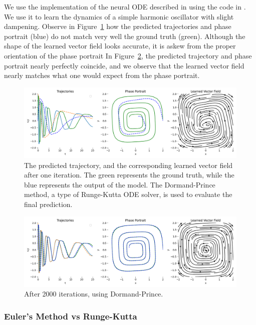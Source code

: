 \documentclass[11pt]{article}
\begin{document}
We use the implementation of the neural ODE described in \cite{chen2018neuralode} using the code in \cite{torchdiffeq}. We use it to learn the dynamics of a simple harmonic oscillator with slight dampening. Observe in Figure~\ref{fig:first_iteration} how the predicted trajectories and phase portrait (blue) do not match very well the ground truth (green). Although the shape of the learned vector field looks accurate, it is askew from the proper orientation of the phase portrait In Figure~\ref{fig:last_iteration}, the predicted trajectory and phase portrait nearly perfectly coincide, and we observe that the learned vector field nearly matches what one would expect from the phase portrait.


\begin{figure}
  \centering
  \includegraphics*[width=\linewidth]{000.png}
  \caption{The predicted trajectory, and the corresponding learned vector field after one iteration. The green represents the ground truth, while the blue represents the output of the model. The Dormand-Prince method, a type of Runge-Kutta ODE solver, is used to evaluate the final prediction.}
  \label{fig:first_iteration}
\end{figure}

\begin{figure}
  \centering
  \includegraphics*[width=\linewidth]{099.png}
  \caption{After 2000 iterations, using Dormand-Prince.}
  \label{fig:last_iteration}
\end{figure}

\subsubsection{Euler's Method vs Runge-Kutta}
\end{document}
